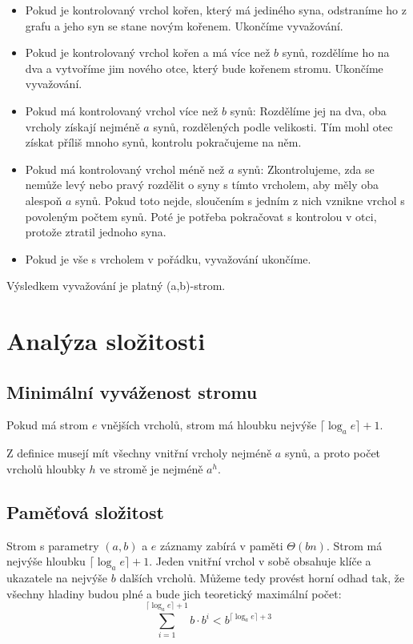 \documentclass[a4paper,11pt,openany]{article}
\begin{document}
\begin{itemize}
	\item
	Pokud je kontrolovaný vrchol kořen, který má jediného syna, odstraníme ho z grafu a jeho syn se stane novým kořenem. Ukončíme vyvažování.
	\item
	Pokud je kontrolovaný vrchol kořen a má více než $b$ synů, rozdělíme ho na dva a vytvoříme jim nového otce, který bude kořenem stromu. Ukončíme vyvažování.
	\item
	Pokud má kontrolovaný vrchol více než $b$ synů: Rozdělíme jej na dva, oba vrcholy získají nejméně $a$ synů, rozdělených podle velikosti. Tím mohl otec získat příliš mnoho synů, kontrolu pokračujeme na něm.
	\item
	Pokud má kontrolovaný vrchol méně než $a$ synů: Zkontrolujeme, zda se nemůže levý nebo pravý rozdělit o syny s tímto vrcholem, aby měly oba alespoň $a$ synů. Pokud toto nejde, sloučením s jedním z nich vznikne vrchol s povoleným počtem synů. Poté je potřeba pokračovat s kontrolou v otci, protože ztratil jednoho syna.
	\item
	Pokud je vše s vrcholem v pořádku, vyvažování ukončíme.
\end{itemize}

Výsledkem vyvažování je platný (a,b)-strom.

\section{Analýza složitosti}

\subsection{Minimální vyváženost stromu}

Pokud má strom $e$ vnějších vrcholů, strom má hloubku nejvýše $\lceil\log_a e\rceil + 1$.

Z definice musejí mít všechny vnitřní vrcholy nejméně $a$ synů, a proto počet vrcholů hloubky $h$ ve stromě je nejméně $a^h$.

\subsection{Paměťová složitost}

Strom s parametry $(a,b)$ a $e$ záznamy zabírá v paměti $\Theta(bn)$. Strom má nejvýše hloubku $\lceil\log_a e\rceil + 1$. Jeden vnitřní vrchol v sobě obsahuje klíče a ukazatele na nejvýše $b$ dalších vrcholů. Můžeme tedy provést horní odhad tak, že všechny hladiny budou plné a bude jich teoretický maximální počet: $$ \sum_{i=1}^{\lceil\log_a e\rceil + 1} b \cdot b^i < b^{\lceil\log_a e\rceil + 3} $$
\end{document}
